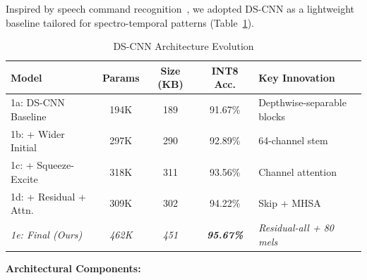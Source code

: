 \documentclass[10pt,a4paper,twoside]{article}
\begin{document}
Inspired by speech command recognition~\cite{zhang2017hello}, we adopted DS-CNN as a lightweight baseline tailored for spectro-temporal patterns (Table~\ref{tab:dscnn_evolution}).

\begin{table}[h]
	\centering\small
	\caption{DS-CNN Architecture Evolution}
	\label{tab:dscnn_evolution}
	\begin{tabular}{lcccl}
		\toprule
		\textbf{Model} & \textbf{Params} & \textbf{Size (KB)} & \textbf{INT8 Acc.} & \textbf{Key Innovation} \\
		\midrule
		1a: DS-CNN Baseline & 194K & 189 & 91.67\% & Depthwise-separable blocks \\
		1b: + Wider Initial & 297K & 290 & 92.89\% & 64-channel stem \\
		1c: + Squeeze-Excite & 318K & 311 & 93.56\% & Channel attention \\
		1d: + Residual + Attn. & 309K & 302 & 94.22\% & Skip + MHSA \\
		\midrule
		\textit{1e: Final (Ours)} & \textit{462K} & \textit{451} & \textit{\textbf{95.67\%}} & \textit{Residual-all + 80 mels} \\
		\bottomrule
	\end{tabular}
\end{table}

\noindent\textbf{Architectural Components:}
\end{document}

